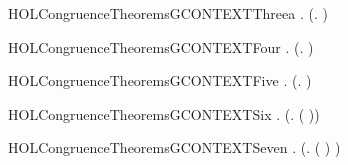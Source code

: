 \begin{SaveVerbatim}{HOLCongruenceTheoremsGCONTEXTThreea}
\HOLTokenTurnstile{} \HOLSymConst{\HOLTokenForall{}}.  (\HOLTokenLambda{}. )
\end{SaveVerbatim}
\newcommand{\HOLCongruenceTheoremsGCONTEXTThreea}{\UseVerbatim{HOLCongruenceTheoremsGCONTEXTThreea}}
\begin{SaveVerbatim}{HOLCongruenceTheoremsGCONTEXTFour}
\HOLTokenTurnstile{} \HOLSymConst{\HOLTokenForall{}}   .
         \HOLSymConst{\HOLTokenConj{}}   \HOLSymConst{\HOLTokenImp{}}
        (\HOLTokenLambda{}.   \HOLSymConst{+}  )
\end{SaveVerbatim}
\newcommand{\HOLCongruenceTheoremsGCONTEXTFour}{\UseVerbatim{HOLCongruenceTheoremsGCONTEXTFour}}
\begin{SaveVerbatim}{HOLCongruenceTheoremsGCONTEXTFive}
\HOLTokenTurnstile{} \HOLSymConst{\HOLTokenForall{}} .
         \HOLSymConst{\HOLTokenConj{}}   \HOLSymConst{\HOLTokenImp{}}  (\HOLTokenLambda{}.   \HOLSymConst{\ensuremath{\parallel}}  )
\end{SaveVerbatim}
\newcommand{\HOLCongruenceTheoremsGCONTEXTFive}{\UseVerbatim{HOLCongruenceTheoremsGCONTEXTFive}}
\begin{SaveVerbatim}{HOLCongruenceTheoremsGCONTEXTSix}
\HOLTokenTurnstile{} \HOLSymConst{\HOLTokenForall{}} .   \HOLSymConst{\HOLTokenImp{}}  (\HOLTokenLambda{}. \HOLConst{\ensuremath{\nu}}  ( ))
\end{SaveVerbatim}
\newcommand{\HOLCongruenceTheoremsGCONTEXTSix}{\UseVerbatim{HOLCongruenceTheoremsGCONTEXTSix}}
\begin{SaveVerbatim}{HOLCongruenceTheoremsGCONTEXTSeven}
\HOLTokenTurnstile{} \HOLSymConst{\HOLTokenForall{}} .   \HOLSymConst{\HOLTokenImp{}}  (\HOLTokenLambda{}.  ( ) )
\end{SaveVerbatim}
